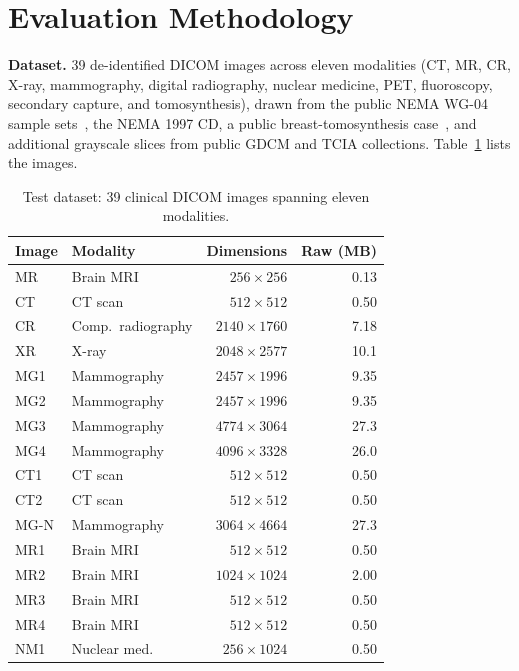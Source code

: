 \documentclass[journal]{IEEEtran}
\begin{document}
\section{Evaluation Methodology}
\label{sec:methodology}

\textbf{Dataset.} 39 de-identified DICOM images across eleven modalities (CT,
MR, CR, X-ray, mammography, digital radiography, nuclear medicine, PET,
fluoroscopy, secondary capture, and tomosynthesis), drawn from the public NEMA
WG-04 sample sets~\cite{nema_wg04}, the NEMA 1997 CD, a public
breast-tomosynthesis case~\cite{clunie_tomo}, and additional grayscale slices
from public GDCM and TCIA collections. Table~\ref{tab:dataset} lists the images.

\begin{table}[htbp]
\centering
\caption{Test dataset: 39 clinical DICOM images spanning eleven modalities.}
\label{tab:dataset}
\scriptsize
\begin{tabular}{llrr}
\toprule
Image & Modality & Dimensions & Raw (MB) \\
\midrule
MR   & Brain MRI      & $256{\times}256$   & 0.13 \\
CT   & CT scan        & $512{\times}512$   & 0.50 \\
CR   & Comp.\ radiography & $2140{\times}1760$ & 7.18 \\
XR   & X-ray          & $2048{\times}2577$ & 10.1 \\
MG1  & Mammography    & $2457{\times}1996$ & 9.35 \\
MG2  & Mammography    & $2457{\times}1996$ & 9.35 \\
MG3  & Mammography    & $4774{\times}3064$ & 27.3 \\
MG4  & Mammography    & $4096{\times}3328$ & 26.0 \\
CT1  & CT scan        & $512{\times}512$   & 0.50 \\
CT2  & CT scan        & $512{\times}512$   & 0.50 \\
MG-N & Mammography    & $3064{\times}4664$ & 27.3 \\
MR1  & Brain MRI      & $512{\times}512$   & 0.50 \\
MR2  & Brain MRI      & $1024{\times}1024$ & 2.00 \\
MR3  & Brain MRI      & $512{\times}512$   & 0.50 \\
MR4  & Brain MRI      & $512{\times}512$   & 0.50 \\
NM1  & Nuclear med.   & $256{\times}1024$  & 0.50 \\

\end{tabular}
\end{table}
\end{document}
